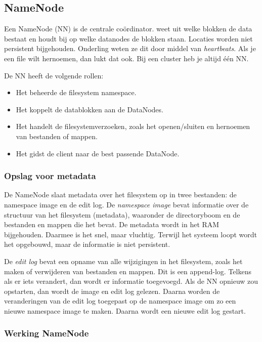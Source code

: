 \documentclass[a4paper,10pt,twoside]{report}
\begin{document}
\subsection{NameNode}

Een NameNode (NN) is de centrale coördinator. weet uit welke blokken de data bestaat en houdt bij op welke datanodes de blokken staan. Locaties worden niet persistent bijgehouden. Onderling weten ze dit door middel van \textit{heartbeats}.  Als je een file wilt hernoemen, dan lukt dat ook. Bij een cluster heb je altijd één NN.

De NN heeft de volgende rollen:

\begin{itemize}
	\item Het beheerde de filesystem namespace.
	\item Het koppelt de datablokken aan de DataNodes.
	\item Het handelt de filesystemverzoeken, zoals het openen/sluiten en hernoemen van bestanden of mappen.
	\item Het gidst de client naar de best passende DataNode.
\end{itemize}

\subsubsection{Opslag voor metadata}

De NameNode slaat metadata over het filesystem op in twee bestanden: de namespace image en de edit log. De \textit{namespace image} bevat informatie over de structuur van het filesystem (metadata), waaronder de directoryboom en de bestanden en mappen die het bevat. De metadata wordt in het RAM bijgehouden. Daarmee is het snel, maar vluchtig. Terwijl het systeem loopt wordt het opgebouwd, maar de informatie is niet persistent. 

De \textit{edit log} bevat een opname van alle wijzigingen in het filesystem, zoals het maken of verwijderen van bestanden en mappen. Dit is een append-log. Telkens als er iets verandert, dan wordt er informatie toegevoegd. Als de NN opnieuw zou opstarten, dan wordt de image en edit log gelezen. Daarna worden de veranderingen van de edit log toegepast op de namespace image om zo een nieuwe namespace image te maken. Daarna wordt een nieuwe edit log gestart.

\subsubsection{Werking NameNode}
\end{document}
